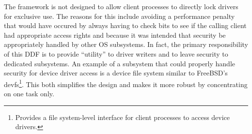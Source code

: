 The framework is not designed to allow client processes to directly lock
drivers for exclusive use.  The reasons for this include avoiding a
performance penalty that would have occured by always having to check bits to
see if the calling client had appropriate access rights and because it was
intended that security be appropriately handled by other OS subsystems.  In
fact, the primary responsibility of this DDF is to provide ``utility'' to
driver writers and to leave security to dedicated subsystems.  An example of a
subsystem that could properly handle security for device driver access is a
device file system similar to FreeBSD's devfs\footnote{Provides a file
system-level interface for client processes to access device drivers.}.
This both simplifies the design and makes it more robust by concentrating on
one task only.






